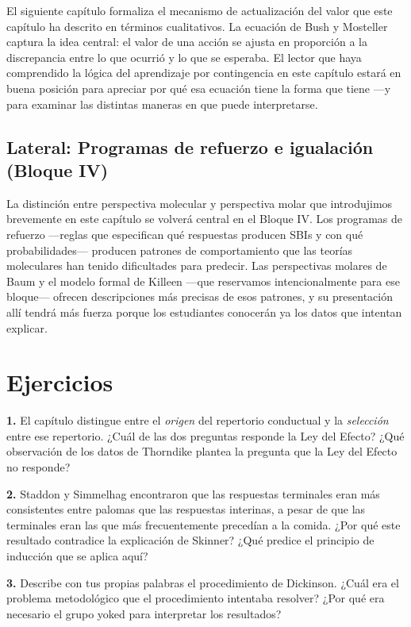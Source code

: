 \documentclass[
  letterpaper,
  DIV=11,
  numbers=noendperiod]{scrreprt}
\begin{document}
\begin{tcolorbox}[enhanced jigsaw, toprule=.15mm, arc=.35mm, colback=white, opacityback=0, colframe=quarto-callout-note-color-frame, breakable, rightrule=.15mm, left=2mm, leftrule=.75mm, bottomrule=.15mm]
El siguiente capítulo formaliza el mecanismo de actualización del valor
que este capítulo ha descrito en términos cualitativos. La ecuación de
Bush y Mosteller captura la idea central: el valor de una acción se
ajusta en proporción a la discrepancia entre lo que ocurrió y lo que se
esperaba. El lector que haya comprendido la lógica del aprendizaje por
contingencia en este capítulo estará en buena posición para apreciar por
qué esa ecuación tiene la forma que tiene ---y para examinar las
distintas maneras en que puede interpretarse.

\subsection{Lateral: Programas de refuerzo e igualación (Bloque
IV)}\label{lateral-programas-de-refuerzo-e-igualaciuxf3n-bloque-iv}

La distinción entre perspectiva molecular y perspectiva molar que
introdujimos brevemente en este capítulo se volverá central en el Bloque
IV. Los programas de refuerzo ---reglas que especifican qué respuestas
producen SBIs y con qué probabilidades--- producen patrones de
comportamiento que las teorías moleculares han tenido dificultades para
predecir. Las perspectivas molares de Baum y el modelo formal de Killeen
---que reservamos intencionalmente para ese bloque--- ofrecen
descripciones más precisas de esos patrones, y su presentación allí
tendrá más fuerza porque los estudiantes conocerán ya los datos que
intentan explicar.

\section{Ejercicios}\label{ejercicios-1}

\textbf{1.} El capítulo distingue entre el \emph{origen} del repertorio
conductual y la \emph{selección} entre ese repertorio. ¿Cuál de las dos
preguntas responde la Ley del Efecto? ¿Qué observación de los datos de
Thorndike plantea la pregunta que la Ley del Efecto no responde?

\textbf{2.} Staddon y Simmelhag encontraron que las respuestas
terminales eran más consistentes entre palomas que las respuestas
interinas, a pesar de que las terminales eran las que más frecuentemente
precedían a la comida. ¿Por qué este resultado contradice la explicación
de Skinner? ¿Qué predice el principio de inducción que se aplica aquí?

\textbf{3.} Describe con tus propias palabras el procedimiento de
Dickinson. ¿Cuál era el problema metodológico que el procedimiento
intentaba resolver? ¿Por qué era necesario el grupo yoked para
interpretar los resultados?


\end{tcolorbox}
\end{document}
